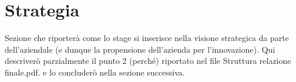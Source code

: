 \section{Strategia}%

Sezione che riporterà come lo stage si inserisce nella visione strategica da parte dell'aziendale (e dunque la  propensione dell’azienda per l’innovazione).
Qui descriverò parzialmente il punto 2 (perché) riportato nel file Struttura relazione finale.pdf. e lo concluderò nella sezione successiva.
